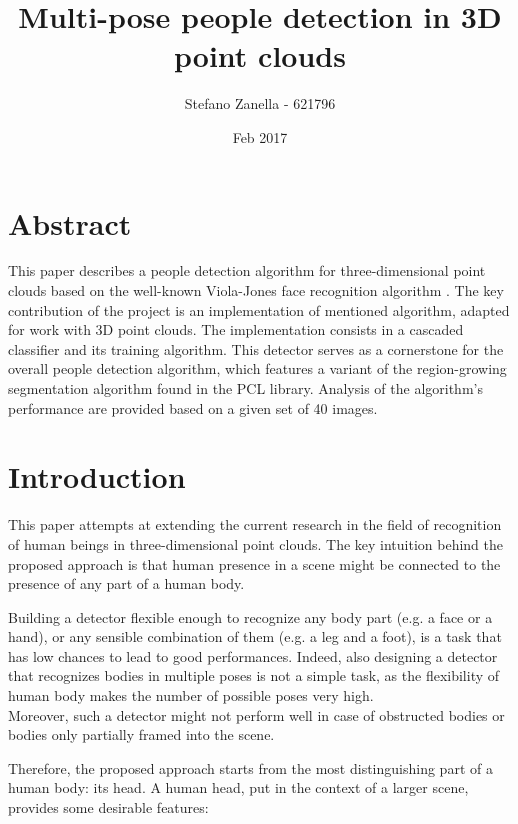 \documentclass[a4paper,11pt,titlepage]{article}
\begin{document}
\title{Multi-pose people detection in 3D point clouds}
\author{Stefano Zanella - 621796}
\date{Feb 2017}

\maketitle

\section{Abstract}
This paper describes a people detection algorithm for three-dimensional point
clouds based on the well-known Viola-Jones face recognition algorithm
\cite{violajones}. The key contribution of the project is an implementation of
mentioned algorithm, adapted for work with 3D point clouds. The implementation
consists in a cascaded classifier and its training algorithm. This detector
serves as a cornerstone for the overall people detection algorithm, which
features a variant of the region-growing segmentation algorithm found in the
PCL library. Analysis of the algorithm's performance are provided based on a
given set of 40 images.

\newpage

\section{Introduction}
This paper attempts at extending the current research in the field of
recognition of human beings in three-dimensional point clouds. The key intuition
behind the proposed approach is that human presence in a scene might be
connected to the presence of any part of a human body.

Building a detector flexible enough to recognize any body part (e.g. a face or a
hand), or any sensible combination of them (e.g. a leg and a foot), is a task
that has low chances to lead to good performances. Indeed, also designing a
detector that recognizes bodies in multiple poses is not a simple task, as the
flexibility of human body makes the number of possible poses very high. \\
Moreover, such a detector might not perform well in case of obstructed bodies or
bodies only partially framed into the scene.

Therefore, the proposed approach starts from the most distinguishing part of
a human body: its head. A human head, put in the context of a larger scene,
provides some desirable features:
\end{document}
